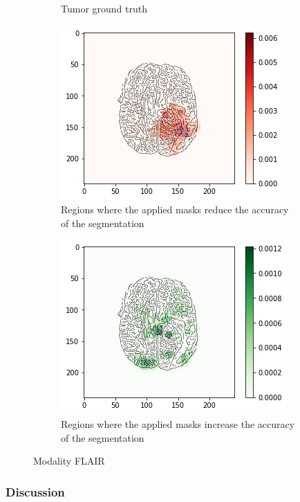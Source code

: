 \begin{figure}[H]
\begin{subfigure}[t]{.4\textwidth}
        \caption{Tumor ground truth}
    \end{subfigure}
    \begin{subfigure}[t]{.45\textwidth}
        \centering
        \includegraphics[width=\linewidth]{chapters/06_hdm/b_Brats18_TCIA08_242_1_L2/38.png}
        \caption{Regions where the applied masks reduce the accuracy of the segmentation}
    \end{subfigure}\hspace{1cm}%
    \begin{subfigure}[t]{.45\textwidth}
        \centering
        \includegraphics[width=\linewidth]{chapters/06_hdm/b_Brats18_TCIA08_242_1_L2/39.png}
        \caption{Regions where the applied masks increase the accuracy of the segmentation}
    \end{subfigure}
    \caption{Modality FLAIR}
\end{figure}

\subsubsection{Discussion}
